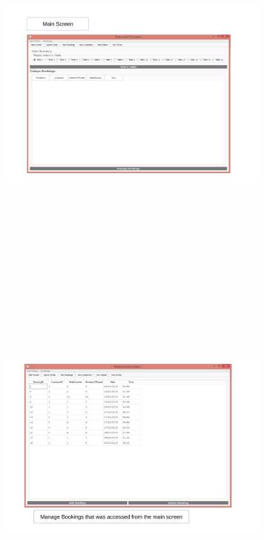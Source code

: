 \begin{landscape}

\begin{figure}[H]
    \includegraphics[height = 15cm]{./Maintenance/images/screen1}
    \caption{} \label{fig:screen1}
\end{figure}

\begin{figure}[H]
    \includegraphics[height = 15cm]{./Maintenance/images/screen2}
    \caption{} \label{fig:screen2}
\end{figure}


\end{landscape}
